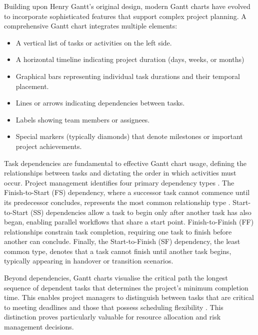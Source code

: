 \documentclass[12pt,nonacm,acmlarge,titlepage,screen]{acmart}
\begin{document}
Building upon Henry Gantt's original design, modern Gantt charts have evolved to incorporate sophisticated features that support complex project planning. A comprehensive Gantt chart integrates multiple elements: \cite{coursera_gantt_2025, aims_ganttchart}
\begin{itemize}
    \item A vertical list of tasks or activities on the left side.
    \item A horizontal timeline indicating project duration (days, weeks, or months) 
    \item Graphical bars representing individual task durations and their temporal placement.
    \item Lines or arrows indicating dependencies between tasks.
    \item Labels showing team members or assignees.
    \item Special markers (typically diamonds) that denote milestones or important project achievements. 
\end{itemize}

Task dependencies are fundamental to effective Gantt chart usage, defining the relationships between tasks and dictating the order in which activities must occur. Project management identifies four primary dependency types \cite{smartsheet_gantt_dependencies_2020, projectmanager_dependencies_2024}. The Finish-to-Start (FS) dependency, where a successor task cannot commence until its predecessor concludes, represents the most common relationship type \cite{tacticalpm_fs_dependency}. Start-to-Start (SS) dependencies allow a task to begin only after another task has also began, enabling parallel workflows that share a start point. Finish-to-Finish (FF) relationships constrain task completion, requiring one task to finish before another can conclude. Finally, the Start-to-Finish (SF) dependency, the least common type, denotes that a task cannot finish until another task begins, typically appearing in handover or transition scenarios.

Beyond dependencies, Gantt charts visualise the critical path the longest sequence of dependent tasks that determines the project's minimum completion time. This enables project managers to distinguish between tasks that are critical to meeting deadlines and those that possess scheduling flexibility \cite{asana_gantt_chart_2025}. This distinction proves particularly valuable for resource allocation and risk management decisions.
\end{document}
